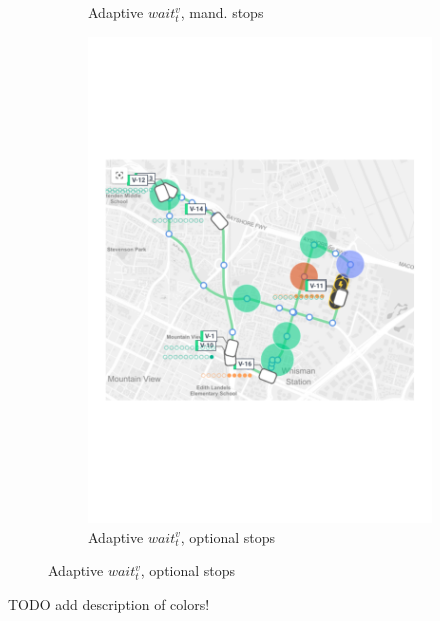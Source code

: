 \documentclass[12pt,a4paper]{article}
\begin{document}
\begin{figure}
{\begin{subfigure}[b]{0.4\textwidth}
  \caption{Adaptive $wait_t^{v}$, mand. stops}
  \label{adaptive}
\end{subfigure}
\begin{subfigure}[b]{0.4\textwidth}
  \includegraphics[width=\linewidth]{./images/optionalstopsgroup.pdf}
  \caption{Adaptive $wait_t^{v}$, optional stops}
  \label{skip}
\end{subfigure}
}
\label{simustate}
\end{figure}
TODO add description of colors!
\end{document}
